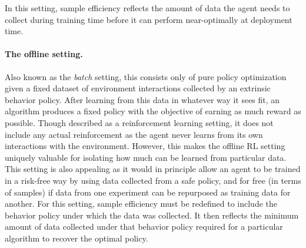 In this setting, sample efficiency reflects the amount of data the agent needs to collect during training time before it can perform near-optimally at deployment time.


\paragraph{The offline setting.}
Also known as the \emph{batch} setting, this consists only of pure policy optimization given a fixed dataset of environment interactions collected by an extrinsic behavior policy.
After learning from this data in whatever way it sees fit, an algorithm produces a fixed policy with the objective of earning as much reward as possible.
Though described as a reinforcement learning setting, it does not include any actual reinforcement as the agent never learns from its own interactions with the environment.
However, this makes the offline RL setting uniquely valuable for isolating how much can be learned from particular data.
This setting is also appealing as it would in principle allow an agent to be trained in a risk-free way by using data collected from a safe policy, and for free (in terms of samples) if data from one experiment can be repurposed as training data for another.
For this setting, sample efficiency must be redefined to include the behavior policy under which the data was collected.
It then reflects the minimum amount of data collected under that behavior policy required for a particular algorithm to recover the optimal policy.


